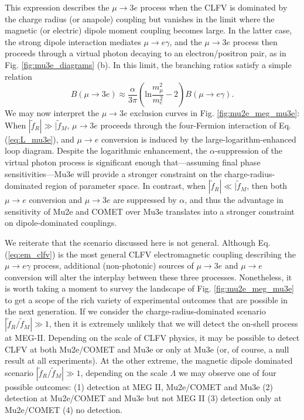 \documentclass{book}[letterpaper,12pt]
\begin{document}
This expression describes the $\mu\rightarrow 3e$ process when the CLFV is dominated by the charge radius (or anapole) coupling but vanishes in the limit where the magnetic (or electric) dipole moment coupling becomes large. In the latter case, the strong dipole interaction mediates $\mu\rightarrow e\gamma$, and the $\mu\rightarrow 3e$ process then proceeds through a virtual photon decaying to an electron/positron pair, as in Fig. \ref{fig:mu3e_diagrams} (b). In this limit, the branching ratios satisfy a simple relation \cite{PhysRevD.53.2442}
\begin{equation}
B(\mu\rightarrow 3e)\approx \frac{\alpha}{3\pi}\left(\mathrm{ln}\frac{m_{\mu}^2}{m_e^2}-2\right)B(\mu\rightarrow e\gamma).
\end{equation}
We may now interpret the $\mu\rightarrow 3e$ exclusion curves in Fig. \ref{fig:mu2e_meg_mu3e}: When $|\tilde{f}_R|\gg |\tilde{f}_M$, $\mu\rightarrow 3e$ proceeds through the four-Fermion interaction of Eq. (\ref{eq:L_mu3e}), and $\mu\rightarrow e$ conversion is induced by the large-logarithm-enhanced loop diagram. Despite the logarithmic enhancement, the $\alpha$-suppression of the virtual photon process is significant enough that---assuming final phase sensitivities---Mu3e will provide a stronger constraint on the charge-radius-dominated region of parameter space. In contrast, when $|\tilde{f}_R|\ll |\tilde{f}_M$, then both $\mu\rightarrow e$ conversion and $\mu\rightarrow 3e$ are suppressed by $\alpha$, and thus the advantage in sensitivity of Mu2e and COMET over Mu3e translates into a stronger constraint on dipole-dominated couplings. 

We reiterate that the scenario discussed here is not general. Although Eq. (\ref{eq:em_clfv}) is the most general CLFV electromagnetic coupling describing the $\mu\rightarrow e\gamma$ process, additional (non-photonic) sources of $\mu\rightarrow 3e$ and $\mu\rightarrow e$ conversion will alter the interplay between these three processes. Nonetheless, it is worth taking a moment to survey the landscape of Fig. \ref{fig:mu2e_meg_mu3e} to get a scope of the rich variety of experimental outcomes that are possible in the next generation. If we consider the charge-radius-dominated scenario $|\tilde{f}_R/\tilde{f}_M|\gg 1$, then it is extremely unlikely that we will detect the on-shell process at MEG-II. Depending on the scale of CLFV physics, it may be possible to detect CLFV at both Mu2e/COMET and Mu3e or only at Mu3e (or, of course, a null result at all experiments). At the other extreme, the magnetic dipole dominated scenario $|\tilde{f}_R/\tilde{f}_M|\gg 1$, depending on the scale $\Lambda$ we may observe one of four possible outcomes: (1) detection at MEG II, Mu2e/COMET and Mu3e (2) detection at Mu2e/COMET and Mu3e but not MEG II (3) detection only at Mu2e/COMET (4) no detection. 
\end{document}

